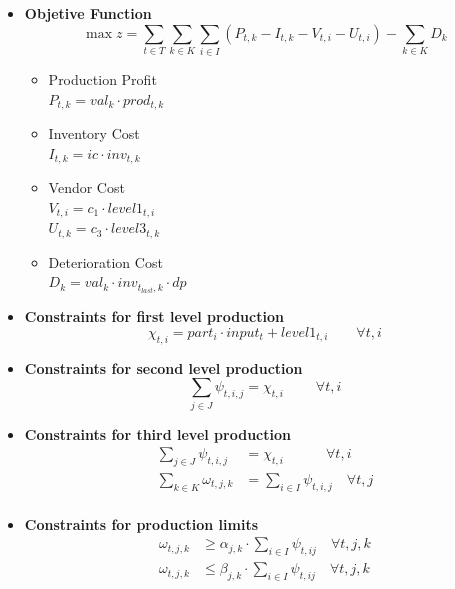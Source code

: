 \documentclass[a4paper,12pt]{article}
\begin{document}
\begin{itemize}
    \item \textbf{Objetive Function}
        \begin{equation}
            \max z = \sum_{t \in T}\sum_{k \in K}\sum_{i \in I} (P_{t, k} - I_{t, k} -V_{t, i} - U_{t, i}) - \sum_{k \in K} {D_k}
        \end{equation}
    
        \begin{itemize}
            \item Production Profit \\ 
                $P_{t, k} = val_k \cdot prod_{t, k}$
            \item Inventory Cost  \\
                $I_{t, k} = ic \cdot inv_{t, k}$
            \item Vendor Cost      \\
                $V_{t, i} = c_1 \cdot level1_{t, i}$ \\
                $U_{t, k} = c_3 \cdot level3_{t, k}$ 
            \item Deterioration Cost \\
                $D_{k} = val_k \cdot inv_{t_{last}, k} \cdot dp$ 
        \end{itemize}
    \item \textbf{Constraints for first level production}
        \begin{equation}
            \chi_{t, i} = part_i \cdot input_t + level1_{t, i} \qquad \forall{t, i}
        \end{equation}
    \item \textbf{Constraints for second level production}
        \begin{equation}
            \sum_{j \in J} \psi_{t, i, j} = \chi_{t, i} \; \qquad \forall{t, i}
        \end{equation}
    \item \textbf{Constraints for third level production}
        \begin{align}
             \sum_{j \in J} \psi_{t, i, j} &= \chi_{t, i} \quad \qquad \forall{t, i} \\
             \sum_{k \in K} \omega_{t, j, k} &= \sum_{i \in I} \psi_{t, i, j} \quad \forall{t, j} \\
        \end{align} 
    \item \textbf{Constraints for production limits}
        \begin{align}
            \omega_{t, j, k} &\geq \alpha_{j, k} \cdot \sum_{i \in I} \psi_{t, i j} \quad \forall{t, j, k} \\
            \omega_{t, j, k} &\leq \beta_{j, k} \cdot \sum_{i \in I} \psi_{t, i j} \quad \forall{t, j, k}
        \end{align}
        

\end{itemize}
\end{document}
